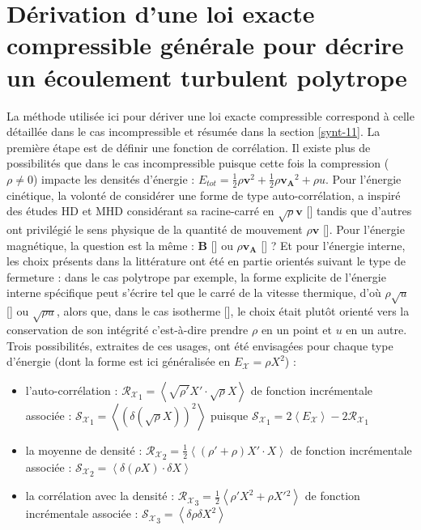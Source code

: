 \section{Dérivation d'une loi exacte compressible générale pour décrire un écoulement turbulent polytrope}
\label{sec-131}

La méthode utilisée ici pour dériver une loi exacte compressible correspond à celle détaillée dans le cas incompressible et résumée dans la section \ref{synt-11}. La première étape est de définir une fonction de corrélation. Il existe plus de possibilités que dans le cas incompressible puisque cette fois la compression ($\rho \neq 0$) impacte les densités d'énergie : $E_{tot} = \frac{1}{2} \rho \boldsymbol{v}^2 + \frac{1}{2} \rho \boldsymbol{v_A}^2 + \rho u $. Pour l'énergie cinétique, la volonté de considérer une forme de type auto-corrélation, a inspiré des études \ac{HD} et \ac{MHD} considérant sa racine-carré en $\sqrt{\rho} \boldsymbol{v} $ [\cite{hellinger_spectral_2021}] tandis que d'autres ont privilégié le sens physique de la quantité de mouvement $\rho \boldsymbol{v}$ [\cite{galtier_exact_2011}]. Pour l'énergie magnétique, la question est la même : $\boldsymbol{B}$ [\cite{ferrand_compact_2021}] ou $\rho \boldsymbol{v_A}$ [\cite{andres_alternative_2017}] ? Et pour l'énergie interne, les choix présents dans la littérature ont été en partie orientés suivant le type de fermeture : dans le cas polytrope par exemple, la forme explicite de l'énergie interne spécifique peut s'écrire tel que le carré de la vitesse thermique, d'où $\rho \sqrt{u}$ [\cite{banerjee_kolmogorov-like_2014}] ou $\sqrt{\rho u}$, alors que, dans le cas isotherme [\cite{galtier_exact_2011}], le choix était plutôt orienté vers la conservation de son intégrité c'est-à-dire prendre $\rho$ en un point et $u$ en un autre. Trois possibilités, extraites de ces usages, ont été envisagées pour chaque type d'énergie (dont la forme est ici généralisée en $E_\mathcal{X} = \rho X^2$) : 
\begin{itemize}
    \item l'auto-corrélation : $\mathcal{R_{X}}_1 = \left<\sqrt{\rho'} X' \cdot \sqrt{\rho} X \right>$ de fonction incrémentale associée :  $\mathcal{S_{X}}_1 = \left<\left(\delta \left(\sqrt{\rho} X\right)\right)^2\right>$ puisque $\mathcal{S_{X}}_1 = 2\left<E_\mathcal{X}\right> - 2\mathcal{R_{X}}_1 $
    \item la moyenne de densité : $\mathcal{R_{X}}_2 = \frac{1}{2}\left< \left(\rho'+\rho\right) X' \cdot X \right>$ de fonction incrémentale associée :  $\mathcal{S_{X}}_2 = \left<\delta \left(\rho X\right) \cdot \delta X \right>$ 
    \item la corrélation avec la densité : $\mathcal{R_{X}}_3 = \frac{1}{2}\left< \rho' X^2 + \rho X'{}^2\right> $ de fonction incrémentale associée :  $\mathcal{S_{X}}_3 = \left<\delta \rho  \delta X^2 \right>$ 
\end{itemize}
